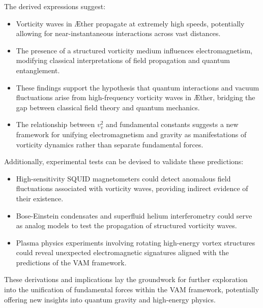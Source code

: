 The derived expressions suggest:

\begin{itemize}
    \item Vorticity waves in \AE ther propagate at extremely high speeds, potentially allowing for near-instantaneous interactions across vast distances.
    \item The presence of a structured vorticity medium influences electromagnetism, modifying classical interpretations of field propagation and quantum entanglement.
    \item These findings support the hypothesis that quantum interactions and vacuum fluctuations arise from high-frequency vorticity waves in \AE ther, bridging the gap between classical field theory and quantum mechanics.
    \item The relationship between $v_v^2$ and fundamental constants suggests a new framework for unifying electromagnetism and gravity as manifestations of vorticity dynamics rather than separate fundamental forces.
\end{itemize}

Additionally, experimental tests can be devised to validate these predictions:
\begin{itemize}
    \item High-sensitivity SQUID magnetometers could detect anomalous field fluctuations associated with vorticity waves, providing indirect evidence of their existence.
    \item Bose-Einstein condensates and superfluid helium interferometry could serve as analog models to test the propagation of structured vorticity waves.
    \item Plasma physics experiments involving rotating high-energy vortex structures could reveal unexpected electromagnetic signatures aligned with the predictions of the VAM framework.
\end{itemize}

These derivations and implications lay the groundwork for further exploration into the unification of fundamental forces within the VAM framework, potentially offering new insights into quantum gravity and high-energy physics.
